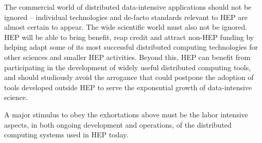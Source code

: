 The commercial world of distributed data-intensive applications should not be 
ignored – individual technologies and de-facto standards relevant to HEP are 
almost certain to appear.  The wide scientific world must also not be ignored.  
HEP will be able to bring benefit, reap credit and attract non-HEP funding by 
helping adapt some of its most successful distributed computing technologies 
for other sciences and smaller HEP activities. Beyond this, HEP can benefit 
from participating in the development of widely useful distributed computing 
tools, and should studiously avoid the arrogance that could postpone the adoption 
of tools developed outside HEP to serve the exponential growth of data-intensive science.

A major stimulus to obey the exhortations above must be the labor intensive aspects, 
in both ongoing development and operations, of the distributed computing systems 
used in HEP today.


